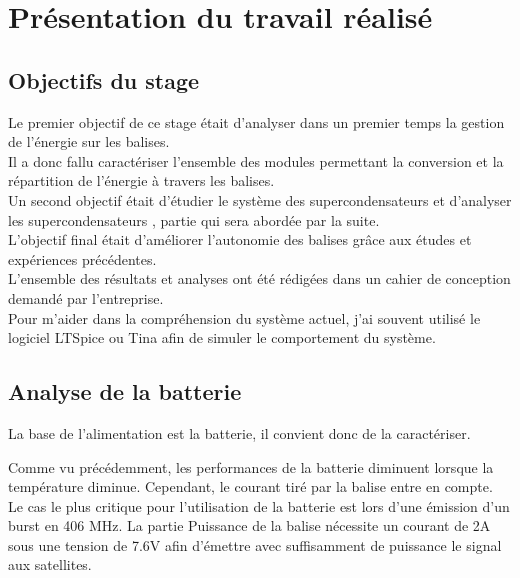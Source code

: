 
\chapter{Présentation du travail réalisé}

\section{Objectifs du stage}

Le premier objectif de ce stage était d'analyser dans un premier temps la gestion de l'énergie sur les balises. \\ 
Il a donc fallu caractériser l'ensemble des modules permettant la conversion et la répartition de l'énergie à travers les balises.\\

Un second objectif était d'étudier le système des supercondensateurs et d'analyser les supercondensateurs , partie qui sera abordée par la suite.\\

L'objectif final était d'améliorer l'autonomie des balises grâce aux études et expériences précédentes.\\

L'ensemble des résultats et analyses ont été rédigées dans un cahier de conception demandé par l'entreprise.\\
Pour m'aider dans la compréhension du système actuel, j'ai souvent utilisé le logiciel LTSpice ou Tina afin de simuler le comportement du système.







\section{Analyse de la batterie}

La base de l'alimentation est la batterie, il convient donc de la caractériser.

Comme vu précédemment, les performances de la batterie diminuent lorsque la température diminue. Cependant, le courant tiré par la balise entre en compte. \\

Le cas le plus critique pour l'utilisation de la batterie est lors d'une émission d'un burst en 406 MHz. La partie Puissance de la balise nécessite un courant de 2A sous une tension de 7.6V afin d'émettre avec suffisamment de puissance le signal aux satellites.\\

